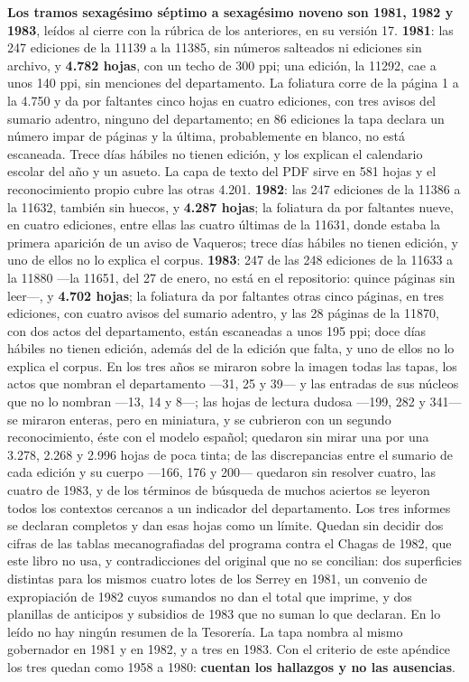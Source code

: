 \textbf{Los tramos sexagésimo séptimo a sexagésimo noveno son 1981, 1982 y 1983}, leídos al cierre con la rúbrica de los anteriores, en su versión 17. \textbf{1981}: las 247 ediciones de la 11139 a la 11385, sin números salteados ni ediciones sin archivo, y \textbf{4.782 hojas}, con un techo de 300 ppi; una edición, la 11292, cae a unos 140 ppi, sin menciones del departamento. La foliatura corre de la página 1 a la 4.750 y da por faltantes cinco hojas en cuatro ediciones, con tres avisos del sumario adentro, ninguno del departamento; en 86 ediciones la tapa declara un número impar de páginas y la última, probablemente en blanco, no está escaneada. Trece días hábiles no tienen edición, y los explican el calendario escolar del año y un asueto. La capa de texto del PDF sirve en 581 hojas y el reconocimiento propio cubre las otras 4.201. \textbf{1982}: las 247 ediciones de la 11386 a la 11632, también sin huecos, y \textbf{4.287 hojas}; la foliatura da por faltantes nueve, en cuatro ediciones, entre ellas las cuatro últimas de la 11631, donde estaba la primera aparición de un aviso de Vaqueros; trece días hábiles no tienen edición, y uno de ellos no lo explica el corpus. \textbf{1983}: 247 de las 248 ediciones de la 11633 a la 11880 ---la 11651, del 27 de enero, no está en el repositorio: quince páginas sin leer---, y \textbf{4.702 hojas}; la foliatura da por faltantes otras cinco páginas, en tres ediciones, con cuatro avisos del sumario adentro, y las 28 páginas de la 11870, con dos actos del departamento, están escaneadas a unos 195 ppi; doce días hábiles no tienen edición, además del de la edición que falta, y uno de ellos no lo explica el corpus. En los tres años se miraron sobre la imagen todas las tapas, los actos que nombran el departamento ---31, 25 y 39--- y las entradas de sus núcleos que no lo nombran ---13, 14 y 8---; las hojas de lectura dudosa ---199, 282 y 341--- se miraron enteras, pero en miniatura, y se cubrieron con un segundo reconocimiento, éste con el modelo español; quedaron sin mirar una por una 3.278, 2.268 y 2.996 hojas de poca tinta; de las discrepancias entre el sumario de cada edición y su cuerpo ---166, 176 y 200--- quedaron sin resolver cuatro, las cuatro de 1983, y de los términos de búsqueda de muchos aciertos se leyeron todos los contextos cercanos a un indicador del departamento. Los tres informes se declaran completos y dan esas hojas como un límite. Quedan sin decidir dos cifras de las tablas mecanografiadas del programa contra el Chagas de 1982, que este libro no usa, y contradicciones del original que no se concilian: dos superficies distintas para los mismos cuatro lotes de los Serrey en 1981, un convenio de expropiación de 1982 cuyos sumandos no dan el total que imprime, y dos planillas de anticipos y subsidios de 1983 que no suman lo que declaran. En lo leído no hay ningún resumen de la Tesorería. La tapa nombra al mismo gobernador en 1981 y en 1982, y a tres en 1983. Con el criterio de este apéndice los tres quedan como 1958 a 1980: \textbf{cuentan los hallazgos y no las ausencias}.

